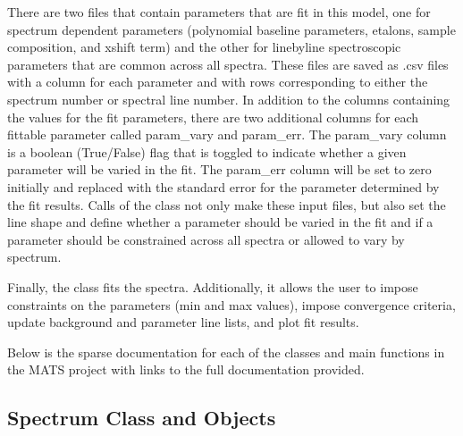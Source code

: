 \documentclass[letterpaper,10pt,english]{sphinxmanual}
\begin{document}
\sphinxAtStartPar
There are two files that contain parameters that are fit in this model, one for spectrum dependent parameters (polynomial baseline parameters, etalons, sample composition, and x\sphinxhyphen{}shift term) and the other for line\sphinxhyphen{}by\sphinxhyphen{}line spectroscopic parameters that are common across all spectra.  These files are saved as .csv files with a column for each parameter and with rows corresponding to either the spectrum number or spectral line number.  In addition to the columns containing the values for the fit parameters, there are two additional columns for each fittable parameter called param\_vary and param\_err.  The param\_vary column is a boolean  (True/False) flag that is toggled to indicate whether a given parameter will be varied in the fit.  The param\_err column will be set to zero initially and replaced with the standard error for the parameter determined by the fit results.  Calls of the {\hyperref[\detokenize{MATS:MATS.generate_fitparam_file.Generate_FitParam_File}]{}} class not only make these input files, but also set the line shape and define whether a parameter should be varied in the fit and if a parameter should be constrained across all spectra or allowed to vary by spectrum.

\sphinxAtStartPar
Finally, the {\hyperref[\detokenize{MATS:MATS.fit_dataset.Fit_DataSet}]{}} class fits the spectra.  Additionally, it allows the user to impose constraints on the parameters (min and max values), impose convergence criteria, update background and parameter line lists, and plot fit results.

\sphinxAtStartPar
Below is the sparse documentation for each of the classes and main functions in the MATS project with links to the full documentation provided.


\subsection{Spectrum Class and Objects}
\label{\detokenize{MATS Summary:spectrum-class-and-objects}}
\end{document}
